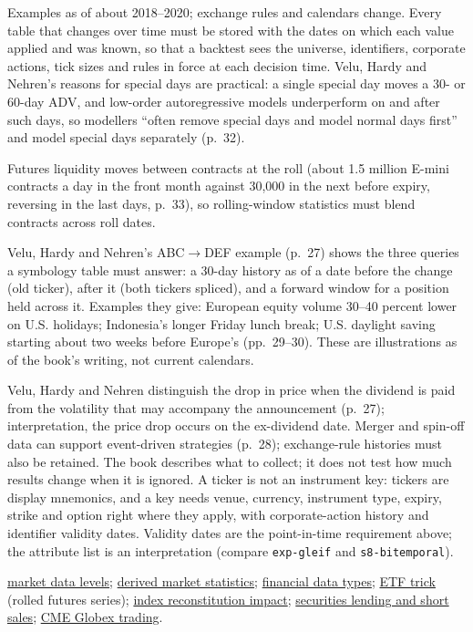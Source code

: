 \begin{qfdata}
 Examples as of about 2018--2020; exchange rules and calendars change. Every table that changes over time must be stored with the dates on which each value applied and was known, so that a backtest sees the universe, identifiers, corporate actions, tick sizes and rules in force at each decision time. Velu, Hardy and Nehren's reasons for special days are practical: a single special day moves a 30- or 60-day ADV, and low-order autoregressive models underperform on and after such days, so modellers ``often remove special days and model normal days first'' and model special days separately (p.~32).

Futures liquidity moves between contracts at the roll (about 1.5 million E-mini contracts a day in the front month against 30,000 in the next before expiry, reversing in the last days, p.~33), so rolling-window statistics must blend contracts across roll dates.

 Velu, Hardy and Nehren's ABC$\to$DEF example (p.~27) shows the three queries a symbology table must answer: a 30-day history as of a date before the change (old ticker), after it (both tickers spliced), and a forward window for a position held across it. Examples they give: European equity volume 30--40 percent lower on U.S. holidays; Indonesia's longer Friday lunch break; U.S. daylight saving starting about two weeks before Europe's (pp.~29--30). These are illustrations as of the book's writing, not current calendars.

 Velu, Hardy and Nehren distinguish the drop in price when the dividend is paid from the volatility that may accompany the announcement (p.~27); interpretation, the price drop occurs on the ex-dividend date. Merger and spin-off data can support event-driven strategies (p.~28); exchange-rule histories must also be retained. The book describes what to collect; it does not test how much results change when it is ignored. A ticker is not an instrument key: tickers are display mnemonics, and a key needs venue, currency, instrument type, expiry, strike and option right where they apply, with corporate-action history and identifier validity dates. Validity dates are the point-in-time requirement above; the attribute list is an interpretation (compare \nolinkurl{exp-gleif} and \nolinkurl{s8-bitemporal}).

 \hyperref[data:market-data-levels]{market data levels}; \hyperref[data:derived-market-statistics]{derived market statistics}; \hyperref[def:financial-data-types]{financial data types}; \hyperref[meth:etf-trick]{ETF trick} (rolled futures series); \hyperref[ev:index-reconstitution-impact]{index reconstitution impact}; \hyperref[mech:securities-lending-short-sale]{securities lending and short sales}; \hyperref[conv:cme-globex-trading]{CME Globex trading}.


\end{qfdata}
